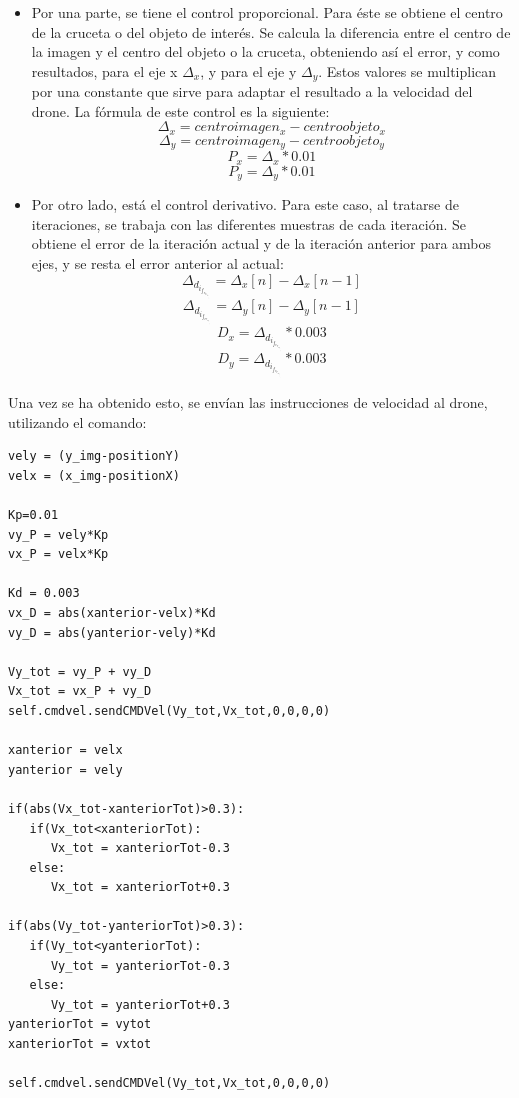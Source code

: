 \begin{itemize}
\item Por una parte, se tiene el control proporcional. Para \'este se obtiene el centro de la cruceta o del objeto de inter\'es. Se calcula la diferencia entre el centro de la imagen y el centro del objeto o la cruceta, obteniendo as\'i el error, y como resultados, para el eje x $\Delta_x$,  y para el eje y $\Delta_y$. Estos valores se multiplican por una constante que sirve para adaptar el resultado a la velocidad del drone. La f\'ormula de este control es la siguiente:  \[\Delta_x = centroimagen_x - centroobjeto_x\]   \[\Delta_y = centroimagen_y - centroobjeto_y\]  \[ P_x = \Delta_x * 0.01\]  \[P_y = \Delta_y * 0.01\]


\item Por otro lado, est\'a el control derivativo. Para este caso, al tratarse de iteraciones, se trabaja con las diferentes muestras de cada iteración. Se obtiene el error de la iteraci\'on actual y de la iteraci\'on anterior para ambos ejes, y se resta el error anterior al actual: \[\Delta_d_i_f_e_r_e_n_c_i_a_x =  \Delta_x [n] - \Delta_x [n-1] \] \[\Delta_d_i_f_e_r_e_n_c_i_a_y =  \Delta_y [n] - \Delta_y [n-1] \]  \[ D_x = \Delta_d_i_f_e_r_e_n_c_i_a_x * 0.003\]  \[D_y = \Delta_d_i_f_e_r_e_n_c_i_a_y * 0.003\]

\end{itemize}

\hspace{1 cm} Una vez se ha obtenido esto, se env\'ian las instrucciones de velocidad al drone, utilizando el comando:
\begin{lstlisting}[backgroundcolor=\color{yellow}]
vely = (y_img-positionY)                        
velx = (x_img-positionX)

Kp=0.01
vy_P = vely*Kp 
vx_P = velx*Kp

Kd = 0.003
vx_D = abs(xanterior-velx)*Kd
vy_D = abs(yanterior-vely)*Kd

Vy_tot = vy_P + vy_D
Vx_tot = vx_P + vy_D
self.cmdvel.sendCMDVel(Vy_tot,Vx_tot,0,0,0,0) 

xanterior = velx
yanterior = vely

if(abs(Vx_tot-xanteriorTot)>0.3):
   if(Vx_tot<xanteriorTot):
      Vx_tot = xanteriorTot-0.3
   else:
      Vx_tot = xanteriorTot+0.3                                 

if(abs(Vy_tot-yanteriorTot)>0.3):
   if(Vy_tot<yanteriorTot):
      Vy_tot = yanteriorTot-0.3
   else:
      Vy_tot = yanteriorTot+0.3                                 
yanteriorTot = vytot
xanteriorTot = vxtot

self.cmdvel.sendCMDVel(Vy_tot,Vx_tot,0,0,0,0) 
\end{lstlisting}
	

